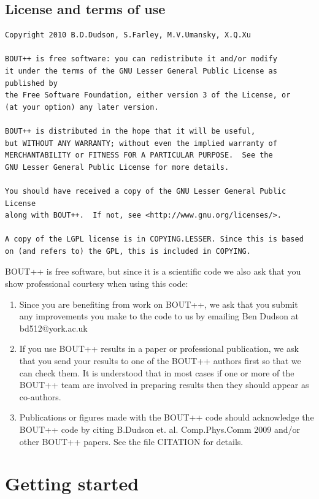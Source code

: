 \documentclass[12pt]{article}
\begin{document}
\subsection{License and terms of use}

\begin{verbatim}
Copyright 2010 B.D.Dudson, S.Farley, M.V.Umansky, X.Q.Xu

BOUT++ is free software: you can redistribute it and/or modify
it under the terms of the GNU Lesser General Public License as published by
the Free Software Foundation, either version 3 of the License, or
(at your option) any later version.

BOUT++ is distributed in the hope that it will be useful,
but WITHOUT ANY WARRANTY; without even the implied warranty of
MERCHANTABILITY or FITNESS FOR A PARTICULAR PURPOSE.  See the
GNU Lesser General Public License for more details.

You should have received a copy of the GNU Lesser General Public License
along with BOUT++.  If not, see <http://www.gnu.org/licenses/>.

A copy of the LGPL license is in COPYING.LESSER. Since this is based
on (and refers to) the GPL, this is included in COPYING.
\end{verbatim}

BOUT++ is free software, but since it is a
scientific code we also ask that you show professional courtesy
when using this code:

\begin{enumerate}
\item Since you are benefiting from work on BOUT++, we ask that you
  submit any improvements you make to the code to us by emailing
  Ben Dudson at bd512@york.ac.uk
\item If you use BOUT++ results in a paper or professional publication,
  we ask that you send your results to one of the BOUT++ authors
  first so that we can check them. It is understood that in most cases
  if one or more of the BOUT++ team are involved in preparing results
  then they should appear as co-authors.
\item Publications or figures made with the BOUT++ code should acknowledge the
  BOUT++ code by citing B.Dudson et. al. Comp.Phys.Comm 2009 \cite{Dudson2009}
  and/or other BOUT++ papers. See the file CITATION for details.
\end{enumerate}

\section{Getting started}
\label{sec:install}
\end{document}
